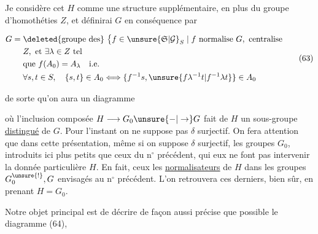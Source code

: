 

Je considère cet $H$ comme une structure supplémentaire, en plus du  groupe d'homothéties $Z$, et définirai $G$ en conséquence par

\[
\begin{aligned}
G={}&\deleted{\text{groupe des}}\ \bigl\{f\in\unsure{\mathfrak S|\mathcal G}_S\mid f\text{ normalise }G,\text{ centralise}\\
& Z,\ \text{et }\exists\lambda\in Z\text{ tel}\\
&\text{que } f(A_0)=A_\lambda\quad\text{i.e.}\\
&\forall s,t\in S,\quad\{s,t\}\in A_0\Longleftrightarrow\{f^{-1}s,\unsure{f\lambda^{-1}t|f^{-1}\lambda t}\}\in A_0
\end{aligned}
\tag*{(63)}
\]

de sorte qu'on aura  un diagramme



où l'inclusion composée $H\longrightarrow G_0\unsure{-|\to}G$ fait de $H$ un sous-groupe \uline{distingué} de $G$. Pour l'instant on ne suppose pas $\delta$ surjectif. On fera attention que dans cette présentation, même si on suppose $\delta$ surjectif, les groupes $G_0$,  introduits ici   plus petits que ceux du n$^\circ$ précédent, qui eux ne font pas intervenir la donnée particulière  $H$. En fait, ceux   les \uline{normalisateurs} de $H$ dans les groupes $G_0^{\unsure{!}},G$ envisagés au n$^\circ$ précédent. L'on retrouvera  ces derniers, bien sûr, en prenant $H=G_0$.

Notre objet principal est de décrire de façon aussi précise que possible le diagramme (64),

